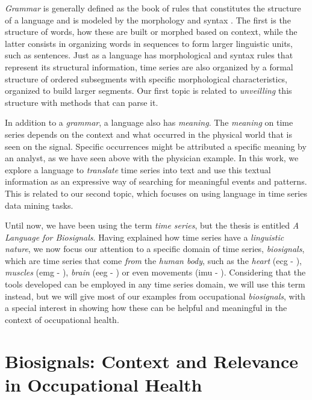 \textit{Grammar} is generally defined as the book of rules that constitutes the structure of a language and is modeled by the morphology and syntax \cite{grammar}. The first is the structure of words, how these are built or morphed based on context, while the latter consists in organizing words in sequences to form larger linguistic units, such as sentences. Just as a language has morphological and syntax rules that represent its structural information, time series are also organized by a formal structure of ordered subsegments with specific morphological characteristics, organized to build larger segments. Our first topic is related to \textit{unveilling} this structure with methods that can parse it.
\par
In addition to a \textit{grammar}, a language also has \textit{meaning}. The \textit{meaning} on time series depends on the context and what occurred in the physical world that is seen on the signal. Specific occurrences might be attributed a specific meaning by an analyst, as we have seen above with the physician example. In this work, we explore a language to \textit{translate} time series into text and use this textual information as an expressive way of searching for meaningful events and patterns. This is related to our second topic, which focuses on using language in time series data mining tasks.
\par
Until now, we have been using the term \textit{time series}, but the thesis is entitled \textit{A Language for Biosignals}. Having explained how time series have a \textit{linguistic nature}, we now focus our attention to a specific domain of time series, \textit{biosignals}, which are time series that come \textit{from} the \textit{human body}, such as the \textit{heart} (\gls{ecg} - ), \textit{muscles} (\gls{emg} - ), \textit{brain} (\gls{eeg} - ) or even movements (\gls{imu} - ). Considering that the tools developed can be employed in any time series domain, we will use this term instead, but we will give most of our examples from occupational \textit{biosignals}, with a special interest in showing how these can be helpful and meaningful in the context of occupational health.

\section{Biosignals: Context and Relevance in Occupational Health} 
\label{sub:context2}

